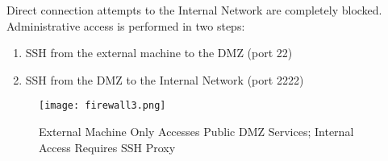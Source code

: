 \documentclass[12pt]{report}
\begin{document}
Direct connection attempts to the Internal Network are completely blocked. Administrative access is performed in two steps:

\begin{enumerate}
    \item SSH from the external machine to the DMZ (port 22)
    \item SSH from the DMZ to the Internal Network (port 2222)
\end{enumerate}

\begin{figure}[h]
    \centering
    \texttt{[image: firewall3.png]}
    \caption{External Machine Only Accesses Public DMZ Services; Internal Access Requires SSH Proxy}
    \label{fig:firewall-external}
\end{figure}
\end{document}
